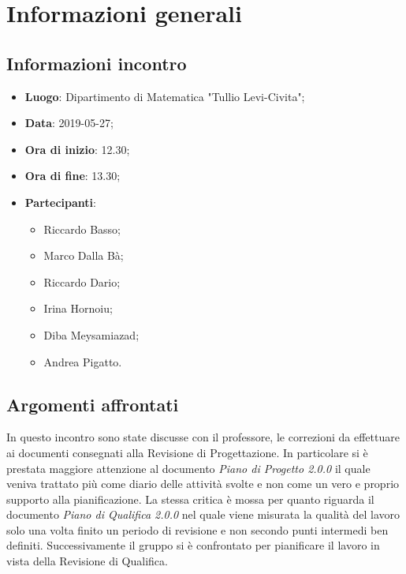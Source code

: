 \section{Informazioni generali}

\subsection{Informazioni incontro}
\begin{itemize}
	\item \textbf{Luogo}: Dipartimento di Matematica "Tullio Levi-Civita";
	\item \textbf{Data}: 2019-05-27;
	\item \textbf{Ora di inizio}: 12.30;
	\item \textbf{Ora di fine}: 13.30;
	\item \textbf{Partecipanti}: 
	\begin{itemize}
		\item Riccardo Basso;
		\item Marco Dalla Bà;
		\item Riccardo Dario;
		\item Irina Hornoiu;
		\item Diba Meysamiazad;
		\item Andrea Pigatto.	
	\end{itemize}
\end{itemize}

\subsection{Argomenti affrontati}
In questo incontro sono state discusse con il professore, le correzioni da effettuare ai documenti consegnati alla Revisione di Progettazione.
In particolare si è prestata maggiore attenzione al documento \textit{Piano di Progetto 2.0.0} il quale veniva trattato più come diario delle attività svolte e non come un vero e proprio supporto alla pianificazione. La stessa critica è mossa per quanto riguarda il documento \textit{Piano di Qualifica 2.0.0} nel quale viene misurata la qualità del lavoro solo una volta finito un periodo di revisione e non secondo punti intermedi ben definiti.
Successivamente il gruppo si è confrontato per pianificare il lavoro in vista della Revisione di Qualifica.
